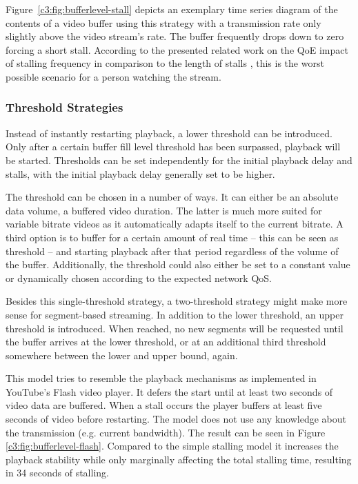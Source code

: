 Figure~\ref{c3:fig:bufferlevel-stall} depicts an exemplary time series diagram of the contents of a video buffer using this strategy with a transmission rate only slightly above the video stream's rate. The buffer frequently drops down to zero forcing a short stall. According to the presented related work on the \gls{QoE} impact of stalling frequency in comparison to the length of stalls \cite{6123395}, this is the worst possible scenario for a person watching the stream.


\subsubsection{Threshold Strategies}

Instead of instantly restarting playback, a lower threshold can be introduced. Only after a certain buffer fill level threshold has been surpassed, playback will be started. Thresholds can be set independently for the initial playback delay and stalls, with the initial playback delay generally set to be higher.

The threshold can be chosen in a number of ways. It can either be an absolute data volume, a buffered video duration. The latter is much more suited for variable bitrate videos as it automatically adapts itself to the current bitrate. A third option is to buffer for a certain amount of real time -- this can be seen as threshold -- and starting playback after that period regardless of the volume of the buffer. Additionally, the threshold could also either be set to a constant value or dynamically chosen according to the expected network \gls{QoS}.

Besides this single-threshold strategy, a two-threshold strategy might make more sense for segment-based streaming. In addition to the lower threshold, an upper threshold is introduced. When reached, no new segments will be requested until the buffer arrives at the lower threshold, or at an additional third threshold somewhere between the lower and upper bound, again. 

This model tries to resemble the playback mechanisms as implemented in YouTube's Flash video player.
It defers the start until at least two seconds of video data are buffered. When a stall occurs the player buffers at least five seconds of video before restarting. The model does not use any knowledge about the transmission (e.g. current bandwidth).
The result can be seen in Figure \ref{c3:fig:bufferlevel-flash}. Compared to the simple stalling model it increases the playback stability while only marginally affecting the total stalling time, resulting in 34 seconds of stalling.

